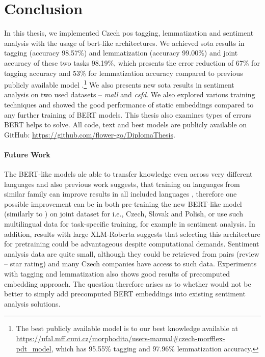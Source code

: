 \chapter*{Conclusion}
\label{chap:concl}
In this thesis, we implemented Czech \acrlong{pos} tagging, lemmatization and sentiment analysis with the usage of \acrlong{bert}-like architectures. We achieved \acrlong{sota} results in tagging (accuracy 98.57\%) and lemmatization (accuracy 99.00\%) and joint accuracy of these two tasks 98.19\%, which presents the error reduction of 67\% for tagging accuracy and 53\% for lemmatization accuracy compared to previous publicly available model \citep{Strakova}.\footnote{The best publicly available model is to our best knowledge available at \url{https://ufal.mff.cuni.cz/morphodita/users-manual\#czech-morfflex-pdt_model}, which has 95.55\% tagging and 97.96\% lemmatization accuracy.} We also presents new \acrlong{sota} results in sentiment analysis on two used datasets -- \textit{mall} and \textit{csfd}. We also explored various training techniques and showed the good performance of static embeddings compared to any further training of BERT models. This thesis also examines types of errors BERT helps to solve. All code, text and best models are publicly available on GitHub: \url{https://github.com/flower-go/DiplomaThesis}.

\subsubsection{Future Work}
The BERT-like models ale able to transfer knowledge even across very different languages and also previous work suggests, that training on languages from similar family can improve results in all included languages \citep{Arkhipov2019}, therefore one possible improvement can be in both pre-training the new BERT-like model (similarly to \citep{Straka2021}) on joint dataset for i.e., Czech, Slovak and Polish, or use such multilingual data for task-specific training, for example in sentiment analysis. In addition, results with large XLM-Roberta suggests that selecting this architecture for pretraining could be advantageous despite computational demands. Sentiment analysis data are quite small, although they could be retrieved from pairs (review -- star rating) and many Czech companies have access to such data. Experiments with tagging and lemmatization also shows good results of precomputed embedding approach. The question therefore arises as to whether would not be better to simply add precomputed BERT embeddings into existing sentiment analysis solutions.




